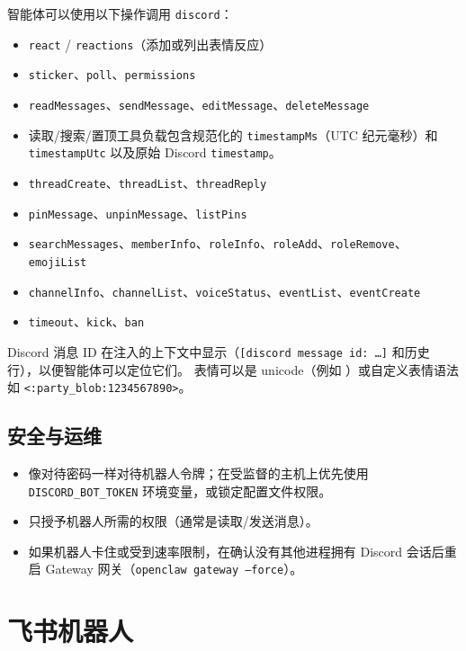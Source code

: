 智能体可以使用以下操作调用 \texttt{discord}：

\begin{itemize}
  \item \texttt{react} / \texttt{reactions}（添加或列出表情反应）
  \item \texttt{sticker}、\texttt{poll}、\texttt{permissions}
  \item \texttt{readMessages}、\texttt{sendMessage}、\texttt{editMessage}、\texttt{deleteMessage}
  \item 读取/搜索/置顶工具负载包含规范化的 \texttt{timestampMs}（UTC 纪元毫秒）和 \texttt{timestampUtc} 以及原始 Discord \texttt{timestamp}。
  \item \texttt{threadCreate}、\texttt{threadList}、\texttt{threadReply}
  \item \texttt{pinMessage}、\texttt{unpinMessage}、\texttt{listPins}
  \item \texttt{searchMessages}、\texttt{memberInfo}、\texttt{roleInfo}、\texttt{roleAdd}、\texttt{roleRemove}、\texttt{emojiList}
  \item \texttt{channelInfo}、\texttt{channelList}、\texttt{voiceStatus}、\texttt{eventList}、\texttt{eventCreate}
  \item \texttt{timeout}、\texttt{kick}、\texttt{ban}
\end{itemize}


Discord 消息 ID 在注入的上下文中显示（\texttt{[discord message id: …]} 和历史行），以便智能体可以定位它们。
表情可以是 unicode（例如 \texttt{}）或自定义表情语法如 \texttt{<:party\_blob:1234567890>}。

\subsection{安全与运维}


\begin{itemize}
  \item 像对待密码一样对待机器人令牌；在受监督的主机上优先使用 \texttt{DISCORD\_BOT\_TOKEN} 环境变量，或锁定配置文件权限。
  \item 只授予机器人所需的权限（通常是读取/发送消息）。
  \item 如果机器人卡住或受到速率限制，在确认没有其他进程拥有 Discord 会话后重启 Gateway 网关（\texttt{openclaw gateway --force}）。
\end{itemize}



\clearpage

\section{飞书机器人}


